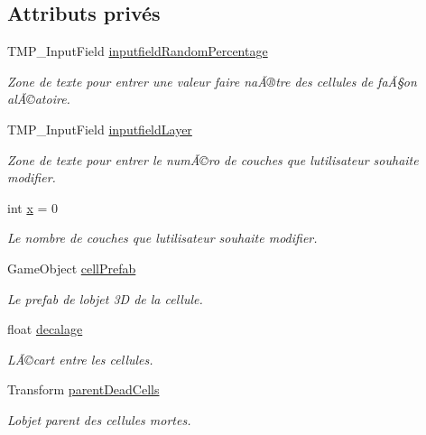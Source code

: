 \subsection*{Attributs privés}
\begin{DoxyCompactItemize}
\item 
T\+M\+P\+\_\+\+Input\+Field \mbox{\hyperlink{class_edit_mode_manager_a8f714287067b2bdf21ff8ab45e72dfba}{inputfield\+Random\+Percentage}}
\begin{DoxyCompactList}\small\item\em Zone de texte pour entrer une valeur faire naÃ®tre des cellules de faÃ§on alÃ©atoire. \end{DoxyCompactList}\item 
T\+M\+P\+\_\+\+Input\+Field \mbox{\hyperlink{class_edit_mode_manager_ad36781169457109afdb5b11d2766bde7}{inputfield\+Layer}}
\begin{DoxyCompactList}\small\item\em Zone de texte pour entrer le numÃ©ro de couches que l\textquotesingle{}utilisateur souhaite modifier. \end{DoxyCompactList}\item 
int \mbox{\hyperlink{class_edit_mode_manager_ab22d78b821b9c0e8a939ef89abe37f5f}{x}} = 0
\begin{DoxyCompactList}\small\item\em Le nombre de couches que l\textquotesingle{}utilisateur souhaite modifier. \end{DoxyCompactList}\item 
Game\+Object \mbox{\hyperlink{class_edit_mode_manager_afbeb266fcf4af2980b1cd76a64b3ce91}{cell\+Prefab}}
\begin{DoxyCompactList}\small\item\em Le prefab de l\textquotesingle{}objet 3D de la cellule. \end{DoxyCompactList}\item 
float \mbox{\hyperlink{class_edit_mode_manager_acecef311540113a1ef783ad637c7bf6c}{decalage}}
\begin{DoxyCompactList}\small\item\em L\textquotesingle{}Ã©cart entre les cellules. \end{DoxyCompactList}\item 
Transform \mbox{\hyperlink{class_edit_mode_manager_a95ebb6471df3c826b6295182d144d570}{parent\+Dead\+Cells}}
\begin{DoxyCompactList}\small\item\em L\textquotesingle{}objet parent des cellules mortes. \end{DoxyCompactList}\item 

\end{DoxyCompactItemize}
